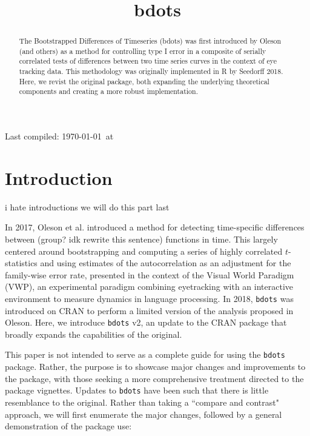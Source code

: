 \documentclass{article}
\title{bdots}
\date{}
\newcommand{\xt}{\texttt}%
\begin{document}

\maketitle

Last compiled: \today \  at \currenttime

%

\begin{abstract}
The Bootstrapped Differences of Timeseries (bdots) was first introduced by Oleson (and others) as a method for controlling type I error in a composite of serially correlated tests of differences between two time series curves in the context of eye tracking data.  This methodology was originally implemented in R by Seedorff 2018. Here, we revist the original package, both expanding the underlying theoretical components and creating a more robust implementation.
\end{abstract}


\section{Introduction}

i hate introductions we will do this part last

In 2017, Oleson et al. introduced a method for detecting time-specific differences between (group? idk rewrite this sentence) functions in time. This largely centered around bootstrapping and computing a series of highly correlated $t$-statistics and using estimates of the autocorrelation as an adjustment for the family-wise error rate, presented in the context of the Visual World Paradigm (VWP), an experimental paradigm combining eyetracking with an interactive environment to measure dynamics in language processing. In 2018, \xt{bdots} was introduced on CRAN to perform a limited version of the analysis proposed in Oleson. Here, we introduce \texttt{bdots} v2, an update to the CRAN package that broadly expands the capabilities of the original. 

This paper is not intended to serve as a complete guide for using the \xt{bdots} package. Rather, the purpose is to showcase major changes and improvements to the package, with those seeking a more comprehensive treatment directed to the package vignettes. Updates to \xt{bdots} have been such that there is little resemblance to the original. Rather than taking a ``compare and contrast" approach, we will first enumerate the major changes, followed by a general demonstration of the package use:
\end{document}

